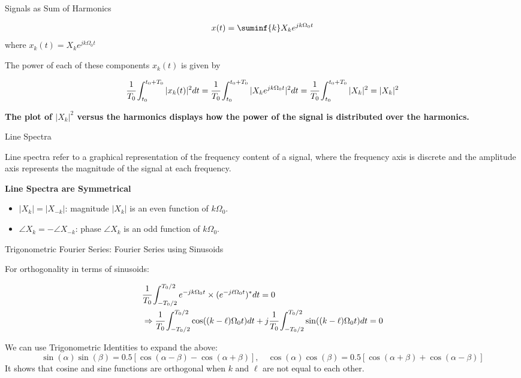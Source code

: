 \documentclass[aspectratio=169,xcolor=dvipsnames,svgnames,x11names,fleqn]{beamer}
\begin{document}
\begin{frame}{Signals as Sum of Harmonics}

    $$
    x(t) = \suminf{k} X_ke^{jk\Omega_0t}
    $$
    where $x_k (t) = X_ke^{jk\Omega_0t}$

The power of each of these components $x_k (t)$ is given by

$$
\cfrac{1}{T_0} \int_{t_0}^{t_0 + T_0} |x_k (t)|^2 dt = \cfrac{1}{T_0} \int_{t_0}^{t_0 + T_0}  | X_ke^{jk\Omega_0t} | ^2 dt  =  \cfrac{1}{T_0} \int_{t_0}^{t_0 + T_0}  | X_k|^2   = | X_k|^2  
$$

\large
\textbf{\color{blue} The plot of $ | X_k|^2$ versus the harmonics displays how the power of the signal is distributed over the harmonics.}

\end{frame}

\begin{frame}{Line Spectra}
    
Line spectra refer to a graphical representation of the frequency content of a signal, where the frequency axis is discrete and the amplitude axis represents the magnitude of the signal at each frequency.

\textbf{Line Spectra are Symmetrical}

\begin{itemize}
    \item $|X_k| = |X_{-k}|$: magnitude  $|X_k|$ is an even function of $k\Omega_0$.
    \item $\angle X_k = - \angle X_{-k}$: phase  $\angle X_k$ is an odd function of $k\Omega_0$.
\end{itemize}

\end{frame}

\begin{frame}{Trigonometric Fourier Series: Fourier Series using Sinusoids}

For orthogonality in terms of sinusoids:

\begin{equation*}
    \begin{aligned}
    & \cfrac{1}{T_0}\int_{-T_0/2}^{T_0/2}   e^{-jk\Omega_0 t} \times (e^{-j\ell \Omega_0 t})^* dt = 0\\
    & \Rightarrow \cfrac{1}{T_0}\int_{-T_0/2}^{T_0/2}   \cos ((k-\ell)\Omega_0 t )dt + j \cfrac{1}{T_0}\int_{-T_0/2}^{T_0/2}   \sin ((k-\ell)\Omega_0 t )dt = 0
\end{aligned}
\end{equation*}

We can use Trigonometric Identities to expand the above:
$$
\sin(\alpha)\sin(\beta) = 0.5 [ \cos(\alpha-\beta) - \cos(\alpha+\beta)],\quad
\cos(\alpha)\cos(\beta) = 0.5 [ \cos(\alpha+\beta) + \cos(\alpha-\beta)]
$$
It shows that cosine and sine functions are orthogonal when $k$ and $\ell$ are not equal to each other.
\end{frame}
\end{document}
